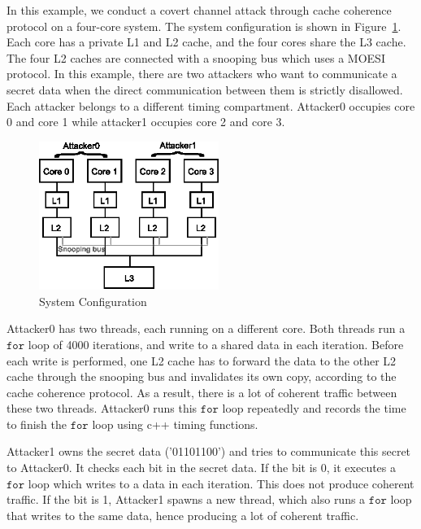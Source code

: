 In this example, we conduct a covert channel attack through cache coherence 
protocol on a four-core system.  The system configuration is shown in 
Figure~\ref{fig:coherent_system}. Each core has a private L1 and L2 cache, and 
the four cores share
the L3 cache. The four L2 caches are connected with a snooping bus which uses a 
MOESI protocol.  In this example, there are two attackers who
want to communicate a secret data when the direct communication between them is 
strictly disallowed. Each attacker belongs to a different timing compartment. 
Attacker0 occupies core 0 and core 1 while attacker1 occupies core 2 and
core 3. 

\begin{figure}
    \begin{center}
        \includegraphics[width=2.3in]{figs/coherent_system.eps}
        \caption{System Configuration}
        \label{fig:coherent_system}
    \end{center}
\end{figure}

Attacker0 has two threads, each running on a different core. Both threads run a 
$\mathtt{for }$ loop of 4000 iterations, and
write to a shared data in each iteration. Before each write is performed, one 
L2 cache has to forward the data
to the other L2 cache through the snooping bus and invalidates its own copy, 
according to the cache coherence protocol.  As a result, there is a lot of 
coherent traffic between these two threads. Attacker0 runs this $\mathtt{for }$ loop 
repeatedly and
records the time to finish the $\mathtt{for }$ loop using c++ timing functions.

Attacker1 owns the secret data ('01101100') and tries to communicate this 
secret to Attacker0. It checks each bit
in the secret data. If the bit is 0, it executes a $\mathtt{for }$ loop which writes to a 
data in each iteration. This does not produce coherent traffic. If the bit is 
1, Attacker1 spawns a new thread, which also runs a $\mathtt{for }$ loop that writes to 
the same data, hence producing a lot of coherent traffic. 

